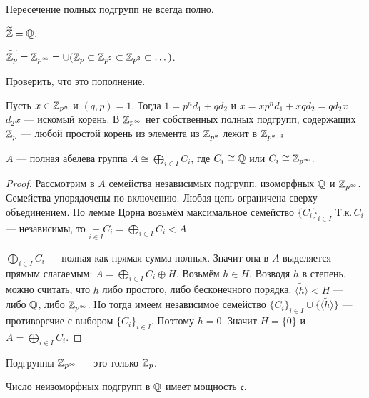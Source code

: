 \documentclass[10pt,a4paper]{article}
\newcommand{\inst}{}
\begin{document}
\begin{note}
Пересечение полных подгрупп не всегда полно.
\end{note}

\begin{ex}$\widetilde{\mathbb Z}=\mathbb Q$.
\end{ex}

\begin{ex}$\widetilde{\mathbb Z_p}=\mathbb Z_{p^\infty}=\cup(\mathbb Z_p\subset\mathbb Z_{p^2}\subset\mathbb Z_{p^3}\subset
\dots)$.
\end{ex}

\begin{problem} Проверить, что это
пополнение.
\end{problem}
\inst Пусть $x\in\mathbb Z_{p^n}$ и $(q,p)=1$.
Тогда $1=p^nd_1+qd_2$ и $x=xp^nd_1+xqd_2=qd_2x$ $d_2x$ --- искомый
корень. В $\mathbb Z_{p^\infty}$ нет собственных полных подгрупп,
содержащих $\mathbb Z_p$
--- любой простой корень из элемента из $\mathbb Z_{p^k}$ лежит в
$\mathbb Z_{p^{k+1}}$

\begin{theorem}
{$A$ --- полная абелева группа \ifif $A\cong
\bigoplus\limits_{i\in I}C_i$, где $C_i\cong\mathbb Q$ или
$C_i\cong\mathbb Z_{p^\infty}$.}\label{completeness_criterion}
\end{theorem}

\begin{proof} Рассмотрим в $A$ семейства независимых подгрупп, изоморфных
$\mathbb Q$ и $\mathbb Z_{p^\infty}$. Семейства упорядочены по включению.
Любая цепь ограничена сверху объединением. По лемме Цорна возьмём
максимальное семейство $\{C_i\}_{i\in I}$ Т.к.\,$C_i$ ---
независимы, то $\mathop+\limits_{i\in I}C_i=\bigoplus\limits_{i\in
I}C_i<A$

$\bigoplus\limits_{i\in I}C_i$ --- полная как прямая сумма полных.
Значит она в $A$ выделяется прямым слагаемым:
$A=\bigoplus\limits_{i\in I}C_i\oplus H$. Возьмём $h\in H$.
Возводя $h$ в степень, можно считать, что $h$ либо простого, либо
бесконечного порядка. $\widetilde{\langle h\rangle}<H$ --- либо
$\mathbb Q$, либо $\mathbb Z_{p^\infty}$. Но тогда имеем независимое семейство
$\{C_i\}_{i\in I}\cup\{\widetilde{\langle h\rangle}\}$ ---
противоречие с выбором $\{C_i\}_{i\in I}$. Поэтому $h=0$. Значит
$H=\{0\}$ и $A=\bigoplus\limits_{i\in I}C_i$.\end{proof}

\begin{problem} Подгруппы $\mathbb Z_{p^\infty}$ --- это только
$\mathbb Z_p$.
\end{problem}

\begin{theorem}Число неизоморфных подгрупп в $\mathbb Q$ имеет мощность
$\mathfrak{c}$.
\end{theorem}
\end{document}
